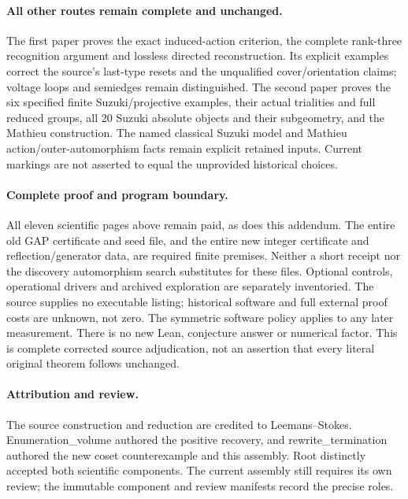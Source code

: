 \documentclass[11pt,a4paper]{article}
\begin{document}
\paragraph{All other routes remain complete and unchanged.}
The first paper proves the exact induced-action criterion, the complete
rank-three recognition argument and lossless directed reconstruction.
Its explicit examples correct the source's last-type resets and the
unqualified cover/orientation claims; voltage loops and semiedges remain
distinguished. The second paper proves the six specified finite
Suzuki/projective examples, their actual trialities and full reduced
groups, all 20 Suzuki absolute objects and their subgeometry, and the
Mathieu construction. The named classical Suzuki model and Mathieu
action/outer-automorphism facts remain explicit retained inputs. Current
markings are not asserted to equal the unprovided historical choices.

\paragraph{Complete proof and program boundary.}
All eleven scientific pages above remain paid, as does this addendum.
The entire old GAP certificate and seed file, and the entire new integer
certificate and reflection/generator data, are required finite premises.
Neither a short receipt nor the discovery automorphism search substitutes
for these files. Optional controls, operational drivers and archived
exploration are separately inventoried. The source supplies no executable
listing; historical software and full external proof costs are unknown,
not zero. The symmetric software policy applies to any later measurement.
There is no new Lean, conjecture answer or numerical factor. This is
complete corrected source adjudication, not an assertion that every
literal original theorem follows unchanged.

\paragraph{Attribution and review.}
The source construction and reduction are credited to Leemans--Stokes.
Enumeration\_volume authored the positive recovery, and
rewrite\_termination authored the new coset counterexample and this
assembly. Root distinctly accepted both scientific components. The current
assembly still requires its own review; the immutable component and
review manifests record the precise roles.
\end{document}
